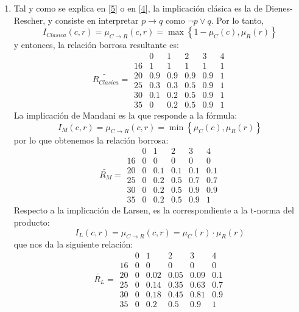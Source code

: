 \documentclass[
]{article}
\begin{document}
\begin{enumerate}
\def\labelenumi{\arabic{enumi}.}
\item
  Tal y como se explica en
  {[}\protect\hyperlink{ref-BotiaPalmaImplicaciones}{5}{]} o en
  {[}\protect\hyperlink{ref-PalmaLogicaBorrosa}{4}{]}, la implicación
  clásica es la de Dienes-Rescher, y consiste en interpretar
  \(p\rightarrow q\) como \(\neg p\lor q\). Por lo tanto,
  \[I_{Clasica}\left(c,r\right)=\mu_{C\rightarrow R}\left(c,r\right)=\max\left\{ 1-\mu_{C}\left(c\right),\mu_{R}\left(r\right)\right\} \]
  y entonces, la relación borrosa resultante es:
  \[\widetilde{R_{Clasica}}=\begin{array}{cccccc}
   & 0 & 1 & 2 & 3 & 4\\
  16 & 1 & 1 & 1 & 1 & 1\\
  20 & 0.9 & 0.9 & 0.9 & 0.9 & 1\\
  25 & 0.3 & 0.3 & 0.5 & 0.9 & 1\\
  30 & 0.1 & 0.2 & 0.5 & 0.9 & 1\\
  35 & 0 & 0.2 & 0.5 & 0.9 & 1
  \end{array}\] La implicación de Mandani es la que responde a la
  fórmula:
  \[I_{M}\left(c,r\right)=\mu_{C\rightarrow R}\left(c,r\right)=\min\left\{ \mu_{C}\left(c\right),\mu_{R}\left(r\right)\right\} \]
  por lo que obtenemos la relación borrosa:
  \[\widetilde{R_{M}}=\begin{array}{cccccc}
   & 0 & 1 & 2 & 3 & 4\\
  16 & 0 & 0 & 0 & 0 & 0\\
  20 & 0 & 0.1 & 0.1 & 0.1 & 0.1\\
  25 & 0 & 0.2 & 0.5 & 0.7 & 0.7\\
  30 & 0 & 0.2 & 0.5 & 0.9 & 0.9\\
  35 & 0 & 0.2 & 0.5 & 0.9 & 1
  \end{array}\] Respecto a la implicación de Larsen, es la
  correspondiente a la t-norma del producto:
  \[I_{L}\left(c,r\right)=\mu_{C\rightarrow R}\left(c,r\right)=\mu_{C}\left(r\right)\cdot\mu_{R}\left(r\right)\]
  que nos da la siguiente relación:
  \[\widetilde{R_{L}}=\begin{array}{cccccc}
   & 0 & 1 & 2 & 3 & 4\\
  16 & 0 & 0 & 0 & 0 & 0\\
  20 & 0 & 0.02 & 0.05 & 0.09 & 0.1\\
  25 & 0 & 0.14 & 0.35 & 0.63 & 0.7\\
  30 & 0 & 0.18 & 0.45 & 0.81 & 0.9\\
  35 & 0 & 0.2 & 0.5 & 0.9 & 1

\end{array}\]
\end{enumerate}
\end{document}
